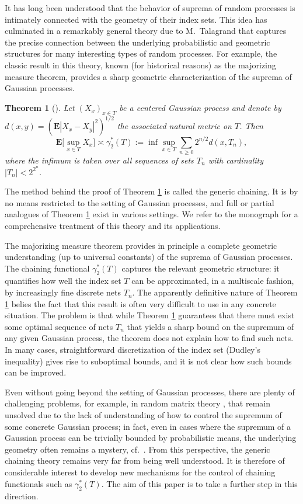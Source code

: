 \documentclass[10pt,reqno]{amsart}
\newtheorem{thm}{Theorem}[section]
\theoremstyle{definition}
\numberwithin{equation}{section}
\numberwithin{figure}{section}
\numberwithin{table}{section}
\begin{document}
It has long been understood that the behavior of suprema of random 
processes is intimately connected with the geometry of their index sets. 
This idea has culminated in a remarkably general theory due to 
M.\ Talagrand that captures the precise connection between the underlying 
probabilistic and geometric structures for many interesting types of 
random processes. For example, the classic result in this theory, known 
(for historical reasons) as the majorizing measure theorem, provides a sharp 
geometric characterization of the suprema of Gaussian processes.

\begin{thm}[\cite{Tal14}]
\label{thm:mm}
Let $(X_x)_{x\in T}$ be a centered Gaussian process and denote by
$d(x,y) = (\mathbf{E}|X_x-X_y|^2)^{1/2}$ the associated natural metric on 
$T$.  Then
$$
        \mathbf{E}\bigg[\sup_{x\in T}X_x\bigg]
        \asymp
        \gamma_2^*(T) :=
        \inf\sup_{x\in T}\sum_{n\ge 0}2^{n/2}d(x,T_n),
$$
where the infimum is taken over all sequences of sets $T_n$
with cardinality $|T_n|<2^{2^n}$.
\end{thm}

The method behind the proof of Theorem \ref{thm:mm} is called the generic 
chaining. It is by no means restricted to the setting of Gaussian 
processes, and full or partial analogues of Theorem \ref{thm:mm} exist in 
various settings. We refer to the monograph \cite{Tal14} for a 
comprehensive treatment of this theory and its applications.

The majorizing measure theorem provides in principle a complete geometric 
understanding (up to universal constants) of the suprema of Gaussian 
processes. The chaining functional $\gamma_2^*(T)$ captures the relevant 
geometric structure: it quantifies how well the index set $T$ can be 
approximated, in a multiscale fashion, by increasingly fine 
discrete nets $T_n$. The apparently definitive nature of Theorem 
\ref{thm:mm} belies the fact that this result is often very difficult to 
use in any concrete situation. The problem is that while Theorem 
\ref{thm:mm} guarantees that there must exist some optimal sequence of 
nets $T_n$ that yields a sharp bound on the supremum of any given Gaussian 
process, the theorem does not explain how to find such nets. In many 
cases, straightforward discretization of the index set (Dudley's 
inequality) gives rise to suboptimal bounds, and it is not clear how such 
bounds can be improved.

Even without going beyond the setting of Gaussian processes, there are 
plenty of challenging problems, for example, in random matrix theory 
\cite{RV08,vH16b,vH17}, that remain unsolved due to the lack of 
understanding of how to control the supremum of some concrete Gaussian 
process; in fact, even in cases where the supremum of a Gaussian process 
can be trivially bounded by probabilistic means, the underlying geometry 
often remains a mystery, cf.\ \cite[p.\ 50]{Tal14}. From this perspective, 
the generic chaining theory remains very far from being well understood. 
It is therefore of considerable interest to develop new mechanisms for the 
control of chaining functionals such as $\gamma_2^*(T)$. The aim of this 
paper is to take a further step in this direction.
\end{document}
